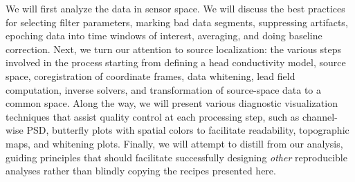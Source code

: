 We will first analyze the data in sensor space. We will discuss the best practices for selecting filter parameters, marking bad data segments, suppressing artifacts, epoching data into time windows of interest, averaging, and doing baseline correction. Next, we turn our attention to source localization: the various steps involved in the process starting from defining a head conductivity model, source space, coregistration of coordinate frames, data whitening, lead field computation, inverse solvers, and transformation of source-space data to a common space. Along the way, we will present various diagnostic visualization techniques that assist quality control at each processing step, such as channel-wise \ac{PSD}, butterfly plots with spatial colors to facilitate readability, topographic maps, and whitening plots. Finally, we will attempt to distill from our analysis, guiding principles that should facilitate successfully designing \textit{other} reproducible analyses rather than blindly copying the recipes presented here. 
